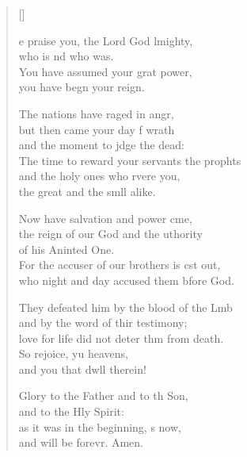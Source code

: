 \settowidth{\versewidth}{The time to reward your servants the prophets +}
\begin{verse}[\versewidth]
  \begin{patverse}
e praise you, the Lord God lmighty,\Med\\
who is nd who was.\\
You have assumed your grat power,\Med\\
you have begn your reign.

The nations have raged in angr,\Flex\\
but then came your day f wrath\Med\\
and the moment to jdge the dead:\\
The time to reward your servants the prophts\Flex\\
and the holy ones who rvere you,\Med\\
the great and the smll alike.

Now have salvation and power cme,\Flex\\
the reign of our God and the uthority\Med\\
of his Aninted One.\\
For the accuser of our brothers is cst out,\Med\\
who night and day accused them bfore God.

They defeated him by the blood of the Lmb\Flex\\
and by the word of thir testimony;\Med\\
love for life did not deter thm from death.\\
So rejoice, yu heavens,\Med\\
and you that dwll therein!

Glory to the Father and to th Son,\Med\\
and to the Hly Spirit:\\
as it was in the beginning, s now,\Med\\
and will be forevr. Amen. 
  \end{patverse}
\end{verse}
